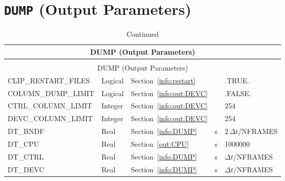 \documentclass[11pt]{book}
\begin{document}
\section{\texorpdfstring{{\tt DUMP}}{DUMP} (Output Parameters)}

\begin{longtable}{@{\extracolsep{\fill}}|l|l|l|l|l|}
\caption[Output control parameters ({\ct DUMP} namelist group)]{For more information see Section~\ref{info:DUMP}.}
\label{tbl:DUMP} \\
\hline
\multicolumn{5}{|c|}{{\ct DUMP} (Output Parameters)} \\
\hline \hline
\endfirsthead
\caption[]{Continued} \\
\hline
\multicolumn{5}{|c|}{{\ct DUMP} (Output Parameters)} \\
\hline \hline
\endhead
{\ct CLIP\_RESTART\_FILES}          & Logical      & Section~\ref{info:restart}             &           & {\ct .TRUE.}                   \\ \hline
{\ct COLUMN\_DUMP\_LIMIT}           & Logical      & Section~\ref{info:out:DEVC}            &           & {\ct .FALSE.}                  \\ \hline
{\ct CTRL\_COLUMN\_LIMIT}           & Integer      & Section~\ref{info:out:DEVC}            &           & 254                            \\ \hline
{\ct DEVC\_COLUMN\_LIMIT}           & Integer      & Section~\ref{info:out:DEVC}            &           & 254                            \\ \hline
{\ct DT\_BNDF}                      & Real         & Section~\ref{info:DUMP}                &  s        & $2\,\Delta t${\ct /NFRAMES}    \\ \hline
{\ct DT\_CPU}                       & Real         & Section~\ref{out:CPU}                  &  s        & 1000000                        \\ \hline
{\ct DT\_CTRL}                      & Real         & Section~\ref{info:DUMP}                &  s        & $\Delta t${\ct /NFRAMES}       \\ \hline
{\ct DT\_DEVC}                      & Real         & Section~\ref{info:DUMP}                &  s        & $\Delta t${\ct /NFRAMES}       \\ \hline

\end{longtable}
\end{document}
